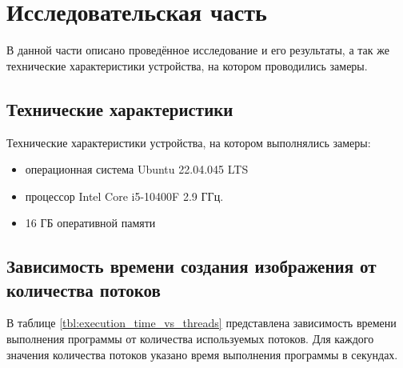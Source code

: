


\chapter{Исследовательская часть}
В данной части описано проведённое исследование и его результаты,
а так же технические характеристики устройства, на котором проводились
замеры.

\section{Технические характеристики}
Технические характеристики устройства, на котором выполнялись
замеры:
\begin{itemize}
\item операционная система Ubuntu 22.04.045 LTS
\item процессор Intel Core i5-10400F 2.9 ГГц.
\item 16 ГБ оперативной памяти
\end{itemize}

\section{Зависимость времени создания изображения от количества потоков}
В таблице \ref{tbl:execution_time_vs_threads} представлена зависимость времени выполнения программы от количества используемых потоков. Для каждого значения количества потоков указано время выполнения программы в секундах.

